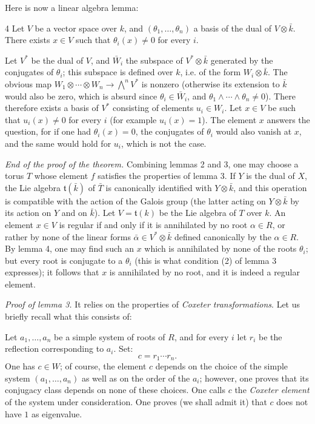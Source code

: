 Here is now a linear algebra lemma:
\begin{lemma}{4}\label{XIV.4}
Let $V$ be a vector space over $k$, and
$(\theta_1,\ldots,\theta_n)$ a basis of
the dual of $V\otimes\bar k$. There
exists $x\in V$ such that $\theta_i(x)\ne0$
for every $i$.
\end{lemma}
Let $V^*$ be the dual of $V$, and
$\bar W_i$ the subspace of
$V^*\otimes\bar k$ generated by
the conjugates of $\theta_i$;
this subspace is defined over
$k$, i.e. of the form
$W_i\otimes\bar k$. The obvious
map $W_1\otimes\cdots\otimes W_n\to\bigwedge^nV^*$
is nonzero (otherwise its
extension to $\bar k$ would
also be zero, which is absurd
since $\theta_i\in\bar W_i$,
and $\theta_1\wedge\cdots\wedge\theta_n\ne0$).
There therefore exists a
basis of $V^*$ consisting
of elements $u_i\in W_i$.
Let $x\in V$ be such that
$u_i(x)\ne0$ for every $i$
(for example $u_i(x)=1$).
The element $x$ answers
the question, for if one
had $\theta_i(x)=0$, the
conjugates of $\theta_i$
would also vanish at $x$,
and the same would hold
for $u_i$, which is not
the case.

\par\medskip\noindent\emph{End of the proof of the theorem.}
Combining lemmas 2 and 3,
one may choose a torus $T$
whose element $f$ satisfies
the properties of lemma 3.
If $Y$ is the dual of $X$,
the Lie algebra
$\mathfrak t(\bar k)$ of
$\bar T$\setcounter{footnote}{8}\setcounter{footnote}{1}
is canonically identified
with $Y\otimes\bar k$,
and this operation is
compatible with the action
of the Galois group (the
latter acting on
$Y\otimes\bar k$ by its
action on $Y$ and on
$\bar k$). Let
$V=\mathfrak t(k)$ be
the Lie algebra of $T$
over $k$. An element
$x\in V$ is regular if
and only if it is
annihilated by no root
$\alpha\in R$, or
rather by none of the
linear forms
$\bar\alpha\in V^*\otimes\bar k$
defined canonically by
the $\alpha\in R$.
By lemma 4, one may
find such an $x$
which is annihilated
by none of the roots
$\theta_i$; but every
root is conjugate to
a $\theta_i$ (this is
what condition (2)
of lemma 3 expresses);
it follows that $x$
is annihilated by no
root, and it is
indeed a regular
 element.

\par\medskip\noindent\emph{Proof of lemma 3.}
It relies on the
properties of
\emph{Coxeter transformations}.
Let us briefly recall
what this consists of:

Let $a_1,\ldots,a_n$
be a simple system
of roots of $R$,
and for every $i$
let $r_i$ be the
reflection corresponding
to $a_i$. Set:
\[
 c=r_1\cdots r_n.
\]
One has $c\in W$;
of course, the element
$c$ depends on the
choice of the simple
system $(a_1,\ldots,a_n)$
as well as on the
order of the $a_i$;
however, one proves
that its conjugacy
class depends on
none of these choices.
One calls $c$ the
\emph{Coxeter element}
of the system under
consideration. One
proves (we shall
admit it) that $c$
does not have $1$
as eigenvalue.

